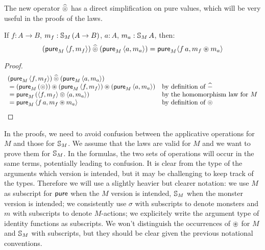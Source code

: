 The new operator $\mathbin{\widehat{\circledcirc}}$ has a direct simplification on pure values, which will be very useful in the proofs of the laws.
\begin{lemma}\label{lemma:pappl}
If $f:A\rightarrow B$, $m_f:\mathbb{S}_{M}\,(A\rightarrow B)$, $a:A$, $m_a:\mathbb{S}_{M}\,A$, then:
$$
(\mathsf{pure}_M\,\langle f, m_f\rangle) \mathbin{\widehat{\circledcirc}} (\mathsf{pure}_M\,\langle a, m_a\rangle) = \mathsf{pure}_M \langle f\,a, m_f \circledast m_a \rangle
$$
\end{lemma}
\begin{proof}
$$
\begin{array}{ll}
(\mathsf{pure}_M\,\langle f, m_f\rangle) \mathbin{\widehat{\circledcirc}} (\mathsf{pure}_M\,\langle a, m_a\rangle) \\
{}= (\mathsf{pure}_M\,(\circledcirc)) \circledast (\mathsf{pure}_M\,\langle f, m_f\rangle) \circledast (\mathsf{pure}_M\,\langle a, m_a\rangle)
  & \mbox{by definition of }\mathbin{\widehat{-}}\\
{}= \mathsf{pure}_M\,(\langle f, m_f\rangle \circledcirc \langle a, m_a\rangle)
  & \mbox{by the homomorphism law for }M\\
{}= \mathsf{pure}_M\,\langle f\,a, m_f \circledast m_a \rangle
  & \mbox{by definition of }\circledcirc
\end{array}
$$
\end{proof}


In the proofs, we need to avoid confusion between the applicative operations for $M$ and those for $\mathbb{S}_{M}$.
We assume that the laws are valid for $M$ and we want to prove them for $\mathbb{S}_{M}$.
In the formulas, the two sets of operations will occur in the same terms, potentially leading to confusion.
It is clear from the type of the arguments which version is intended, but it may be challenging to keep track of the types.
Therefore we will use a slightly heavier but clearer notation: we use $M$ as subscript for $\mathsf{pure}$ when the $M$ version is intended, $\mathbb{S}_{M}$ when the monster version is intended; we consistently use $\sigma$ with subscripts to denote monsters and $m$ with subscripts to denote $M$-actions; we explicitely write the argument type of identity functions as subscripts.
We won't distinguish the occurrences of $\circledast$ for $M$ and $\mathbb{S}_{M}$ with subscripts, but they should be clear given the previous notational conventions.

